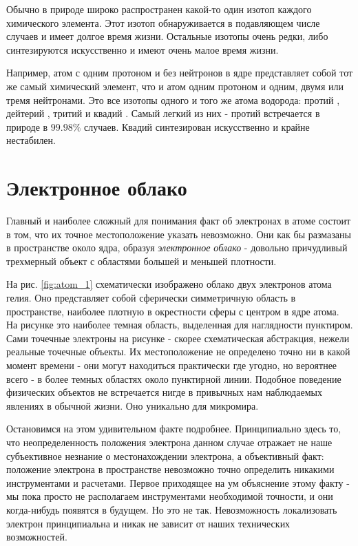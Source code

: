 Обычно в природе широко распространен какой-то один изотоп каждого химического элемента.
Этот изотоп обнаруживается в подавляющем числе случаев и имеет долгое время жизни.
Остальные изотопы очень редки, либо синтезируются искусственно и имеют очень малое время жизни. 

Например, атом с одним протоном и без нейтронов в ядре представляет собой тот же самый химический элемент, что и атом одним протоном и одним, двумя или тремя нейтронами.
Это все изотопы одного и того же атома водорода: протий , дейтерий , тритий  и квадий .
Самый легкий из них - протий встречается в природе в $99.98\%$ случаев.
Квадий синтезирован искусственно и крайне нестабилен.


\section*{Электронное облако}

Главный и наиболее сложный для понимания факт об электронах в атоме состоит в том, что их точное местоположение указать невозможно.
Они как бы размазаны в пространстве около ядра, образуя \textit{электронное облако} - довольно причудливый трехмерный объект с областями большей и меньшей плотности.

На рис. \ref{fig:atom_1} схематически изображено облако двух электронов атома гелия.
Оно представляет собой сферически симметричную область в пространстве, наиболее плотную в окрестности сферы с центром в ядре атома.
На рисунке это наиболее темная область, выделенная для наглядности пунктиром.
Сами точечные электроны на рисунке - скорее схематическая абстракция, нежели реальные точечные объекты.
Их местоположение не определено точно ни в какой момент времени - они могут находиться практически где угодно, но вероятнее всего - в более темных областях около пунктирной линии.
Подобное поведение физических объектов не встречается нигде в привычных нам наблюдаемых явлениях в обычной жизни.
Оно уникально для микромира. 

Остановимся на этом удивительном факте подробнее.
Принципиально здесь то, что неопределенность положения электрона данном случае отражает не наше субъективное незнание о местонахождении электрона, а объективный факт: положение электрона в пространстве невозможно точно определить никакими инструментами и расчетами.
Первое приходящее на ум объяснение этому факту - мы пока просто не располагаем инструментами необходимой точности, и они когда-нибудь появятся в будущем.
Но это не так.
Невозможность локализовать электрон принципиальна и никак не зависит от наших технических возможностей.

